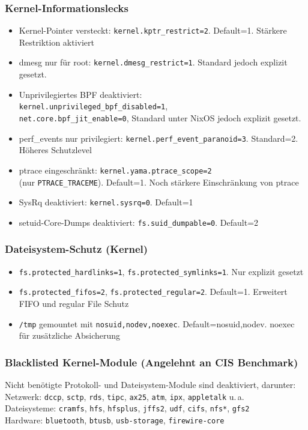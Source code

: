 \subsubsection*{Kernel-Informationslecks}
\begin{itemize}
  \item Kernel-Pointer versteckt: \texttt{kernel.kptr\_restrict=2}. Default=1. Stärkere Restriktion aktiviert
  \item dmesg nur für root: \texttt{\textcolor{OliveGreen}{kernel.dmesg\_restrict=1}}. Standard jedoch explizit gesetzt.
  \item Unprivilegiertes \acs{BPF} deaktiviert: \\
  \textcolor{OliveGreen}{\texttt{kernel.unprivileged\_bpf\_disabled=1},\\
  \texttt{net.core.bpf\_jit\_enable=0}}, Standard unter NixOS jedoch explizit gesetzt.
  \item perf\_events nur privilegiert: \texttt{kernel.perf\_event\_paranoid=3}. Standard=2. Höheres Schutzlevel
  \item ptrace eingeschränkt: \texttt{kernel.yama.ptrace\_scope=2}\\(nur \texttt{PTRACE\_TRACEME}). Default=1. Noch stärkere Einschränkung von ptrace
  \item SysRq deaktiviert: \texttt{kernel.sysrq=0}. Default=1
  \item setuid-Core-Dumps deaktiviert: \texttt{fs.suid\_dumpable=0}. Default=2
\end{itemize}

\subsubsection*{Dateisystem-Schutz (Kernel)}
\begin{itemize}
  \item \textcolor{OliveGreen}{\texttt{fs.protected\_hardlinks=1}, \texttt{fs.protected\_symlinks=1}}. Nur explizit gesetzt
  \item \texttt{fs.protected\_fifos=2}, \texttt{fs.protected\_regular=2}. Default=1. Erweitert \acs{FIFO} und regular File Schutz
  \item \texttt{/tmp} gemountet mit \texttt{nosuid,nodev,noexec}. Default=nosuid,nodev. noexec für zusätzliche Absicherung
\end{itemize}

\subsubsection*{Blacklisted Kernel-Module (Angelehnt an \acs{CIS} Benchmark)}
Nicht benötigte Protokoll- und Dateisystem-Module sind deaktiviert, darunter:\\
Netzwerk: \texttt{dccp}, \texttt{sctp}, \texttt{rds}, \texttt{tipc}, \texttt{ax25}, \texttt{atm}, \texttt{ipx}, \texttt{appletalk} u.\,a.\\
Dateisysteme: \texttt{cramfs}, \texttt{hfs}, \texttt{hfsplus}, \texttt{jffs2}, \texttt{udf}, \texttt{cifs}, \texttt{nfs*}, \texttt{gfs2}\\
Hardware: \texttt{bluetooth}, \texttt{btusb}, \texttt{usb-storage}, \texttt{firewire-core}

